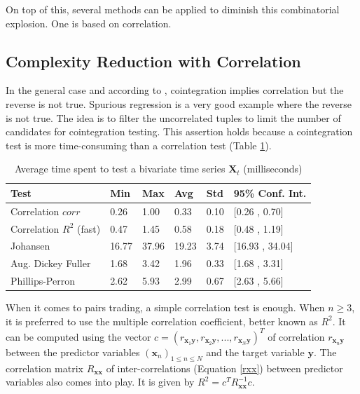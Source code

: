 \documentclass[11pt,a4,twosided,singlespacing,titlepagenumber=on]{scrreprt}
\numberwithin{equation}{chapter} %
\theoremstyle{remark}
\newcommand{\matr}[1]{\mathbf{#1}}
\begin{document}
On top of this, several methods can be applied to diminish this combinatorial explosion. One is based on correlation. 

\subsection{Complexity Reduction with Correlation}
\label{Complexity_Reduction_with_Correlation}
In the general case and according to \cite{vidyamurthy2004}, cointegration implies correlation but the reverse is not true. Spurious regression is a very good example where the reverse is not true. The idea is to filter the uncorrelated tuples to limit the number of candidates for cointegration testing. This assertion holds because a cointegration test is more time-consuming than a correlation test (Table \ref{time_spent_test_bivariate}).

\begin{table}[H]
\centering
\begin{tabular}{llllll}
\hline
\multicolumn{1}{|l|}{Test}     & \multicolumn{1}{|l|}{Min} & \multicolumn{1}{|l|}{Max} & \multicolumn{1}{|l|}{Avg} & \multicolumn{1}{|l|}{Std} & \multicolumn{1}{|l|}{95\% Conf. Int.} \\ \hline
Correlation $corr$						 &  0.26  & 1.00  & 0.33  & 0.10 & [0.26 , 0.70]\\
Correlation $R^2$ (fast)       &  0.47  & 1.45  & 0.58  & 0.18 & [0.48 , 1.19]\\
Johansen                       &  16.77 & 37.96 & 19.23 & 3.74 & [16.93 , 34.04]\\
Aug. Dickey Fuller             &  1.68  & 3.42  & 1.96  & 0.33 & [1.68 , 3.31]\\
Phillips-Perron                &  2.62  & 5.93  & 2.99  & 0.67 & [2.63 , 5.66]\\
\hline
\end{tabular}
\caption{Average time spent to test a bivariate time series $\matr{X}_t$ (milliseconds)}
\label{time_spent_test_bivariate}
\end{table}

When it comes to pairs trading, a simple correlation test is enough. When $n \geq 3$, it is preferred to use the multiple correlation coefficient, better known as $R^2$. It can be computed using the vector $c = (r_{\matr{x}_1\matr{y}}, r_{\matr{x}_2\matr{y}},...,r_{\matr{x}_N\matr{y}})^T$ of correlation $r_{\matr{x}_n\matr{y}}$ between the predictor variables $(\matr{x}_n)_{1 \leq n \leq N}$ and the target variable $\matr{y}$. The correlation matrix $R_{\matr{x}\matr{x}}$ of inter-correlations (Equation \ref{rxx}) between predictor variables also comes into play. It is given by $R^2 = c^T R_{\matr{x}\matr{x}}^{-1}c$.
\end{document}
